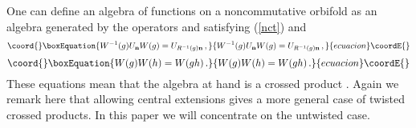 \documentclass[a4paper,a4paper]{article}
\begin{document}
One can define an algebra of functions on a  noncommutative orbifold as an algebra generated by 
the operators \coordHE{} and  \coordHE{} satisfying  (\ref{nct}) and 
\begin{equation}\coord{}\boxEquation{ \label{WU}
 W^{-1}(g)U_{\bf n}W(g) = U_{R^{-1}(g){\bf n}} \, , 
}{ W^{-1}(g)U_{\bf n}W(g) = U_{R^{-1}(g){\bf n}} \, , 
}{ecuacion}\coordE{}\end{equation}
\begin{equation}\coord{}\boxEquation{
  W(g)W(h) = W(gh) \, .
}{
  W(g)W(h) = W(gh) \, .
}{ecuacion}\coordE{}\end{equation}
These equations  mean that the algebra at hand is a crossed product 
\coordHE{}. Again we remark here that allowing central extensions gives a more general case of 
twisted crossed products. In this paper we will concentrate on the untwisted case.
\end{document}
